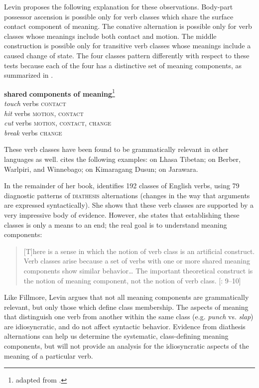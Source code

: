 Levin proposes the following explanation for these observations. Body-part possessor ascension is possible only for verb classes which share the surface contact component of meaning. The conative alternation is possible only for verb classes whose meanings include both contact and motion. The middle construction is possible only for transitive verb classes whose meanings include a caused change of state. The four classes pattern differently with respect to these tests because each of the four has a distinctive set of meaning components, as summarized in .


\ea \label{ex:7.32}
\textbf{shared} \textbf{components of meaning}\footnote{adapted from \citet[268]{Saeed2009}.}\\
\textit{touch} verbs  \textsc{contact}\textit{\\
hit} verbs  \textsc{motion, contact}\textit{\\
cut} verbs  \textsc{motion, contact, change}\textit{\\
break} verbs  \textsc{change}
\z


These verb classes have been found to be grammatically relevant in other languages as well. \citet{Levin2015} cites the following examples: \citet{DeLancey1995,DeLancey2000} on Lhasa Tibetan; \citet{GuersselEtAl1985} on Berber, Warlpiri, and Winnebago; \citet{Kroeger2010} on Kimaragang Dusun; \citet{Vogel2005} on Jarawara.

In the remainder of her book, \citet{Levin1993} identifies 192 classes of English verbs, using 79 diagnostic patterns of \textsc{diathesis} alternations (changes in the way that arguments are expressed syntactically). She shows that these verb classes are supported by a very impressive body of evidence. However, she states that establishing these classes is only a means to an end; the real goal is to understand meaning components:


\begin{quote}
{}[T]here is a sense in which the notion of verb class is an artificial construct. Verb classes arise because a set of verbs with one or more shared meaning components show similar behavior… The important theoretical construct is the notion of meaning component, not the notion of verb class. [\citealt{Levin1993}: 9–10]
\end{quote}


Like Fillmore, Levin argues that not all meaning components are grammatically relevant, but only those which define class membership. The aspects of meaning that distinguish one verb from another within the same class (e.g. \textit{punch} vs. \textit{slap}) are idiosyncratic, and do not affect syntactic behavior. Evidence from diathesis alternations can help us determine the systematic, class-defining meaning components, but will not provide an analysis for the idiosyncratic aspects of the meaning of a particular verb.

